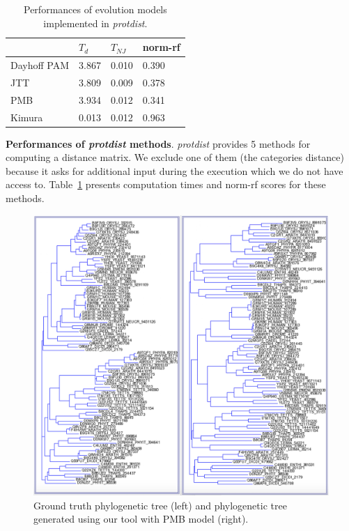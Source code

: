 \documentclass[11pt,letterpaper]{article}
\theoremstyle{definition}
\begin{document}
\begin{table}[h]
\centering
	\begin{tabular}{l|lll}
	\hline
	&	$T_d$	& $T_{NJ}$	& norm-rf  \\
	\hline
	Dayhoff PAM	&	3.867	&	0.010	&	0.390	\\
	JTT			&	3.809	&	0.009	&	0.378	\\
	PMB			&	3.934	&	0.012	&	0.341	\\
	Kimura		&	0.013	&	0.012	&	0.963	\\
	\hline
	\end{tabular}
\caption{Performances of evolution models implemented in \textit{protdist}.}\label{tab:dist2}
\end{table}

\textbf{Performances of \textit{protdist} methods}. \textit{protdist} provides 5 methods for computing a distance matrix. We exclude one of them (the categories distance) because it asks for additional input during the execution which we do not have access to. Table~\ref{tab:dist2} presents computation times and norm-rf scores for these methods.

\begin{figure}[h!]
  \centering
  \includegraphics[width=\textwidth]{gt-PMB.jpg}
  \caption{Ground truth phylogenetic tree (left) and phylogenetic tree generated using our tool with PMB model (right).}
  \label{fig:gt-PMB}
\end{figure}
\end{document}
